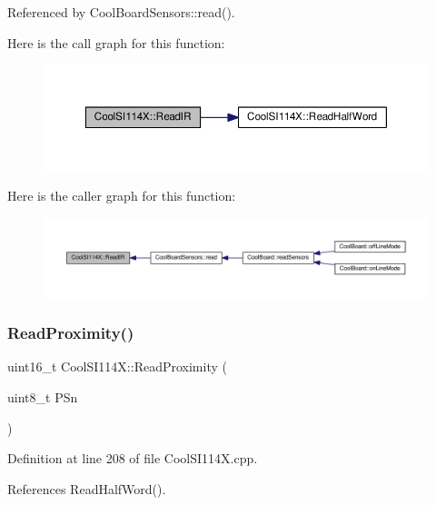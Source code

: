Referenced by Cool\+Board\+Sensors\+::read().

Here is the call graph for this function\+:
\nopagebreak
\begin{figure}[H]
\begin{center}
\leavevmode
\includegraphics[width=350pt]{dd/d67/class_cool_s_i114_x_abc536ee7ae8e3ba9d1069acc3889a2cf_cgraph}
\end{center}
\end{figure}
Here is the caller graph for this function\+:
\nopagebreak
\begin{figure}[H]
\begin{center}
\leavevmode
\includegraphics[width=350pt]{dd/d67/class_cool_s_i114_x_abc536ee7ae8e3ba9d1069acc3889a2cf_icgraph}
\end{center}
\end{figure}
\mbox{\label{class_cool_s_i114_x_a194fede1105508c7803dbb567cbdcc67}} 
\subsubsection{\texorpdfstring{Read\+Proximity()}{ReadProximity()}}
{\footnotesize\ttfamily uint16\+\_\+t Cool\+S\+I114\+X\+::\+Read\+Proximity (\begin{DoxyParamCaption}\item[{uint8\+\_\+t}]{P\+Sn }\end{DoxyParamCaption})}



Definition at line 208 of file Cool\+S\+I114\+X.\+cpp.



References Read\+Half\+Word().


